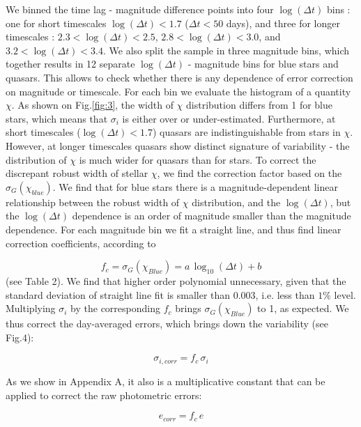 \documentclass[fleqn,usenatbib]{mnras}  %
\begin{document}
We binned the time lag - magnitude difference points into four $\log (\Delta t ) $ bins : one for short timescales  $\log (\Delta t ) < 1.7$ ($\Delta t < 50$ days), and three for longer timescales : $2.3<\log{(\Delta t)}<2.5$, $2.8<\log{(\Delta t)}<3.0$, and $3.2<\log{(\Delta t)}<3.4$.  We also split the sample in three magnitude bins, which together results in 12 separate $\log(\Delta t)$ - magnitude bins for blue stars and quasars. This allows to check whether there is any dependence of error correction on magnitude or timescale.  For each bin we evaluate the histogram of a quantity $\chi$. As shown on Fig.\ref{fig:3}, the width of $\chi$ distribution differs from 1 for blue stars, which means that $\sigma_{i}$ is either over or under-estimated. Furthermore, at short timescales ($\log{(\Delta t)} < 1.7$) quasars are indistinguishable from stars in $\chi$. However, at longer timescales quasars show distinct signature of variability - the distribution of $\chi$ is much wider for quasars than for stars. To correct the discrepant robust width of stellar $\chi$, we find the correction factor based on the $\sigma_{G}(\chi_{blue})$.  We find that for blue stars there is a magnitude-dependent  linear relationship between the robust width of $\chi$ distribution, and the $\log{(\Delta t)}$, but the $\log{(\Delta t)}$ dependence is an order of magnitude smaller than the magnitude dependence.  For each magnitude bin we fit a straight line, and thus find linear correction coefficients, according to 

\begin{equation}
\label{eq:fc}
f_{c} = \sigma_{G}(\chi_{Blue}) = a  \, \log_{10}(\Delta t) + b
\end{equation}
(see Table 2). We find that higher order polynomial unnecessary, given that the standard deviation of straight line fit is smaller than  0.003, i.e. less than $1\%$ level. 
Multiplying  $\sigma_{i}$ by the corresponding $f_{c}$ brings  $\sigma_{G}(\chi_{Blue})$ to 1, as expected. We thus correct the day-averaged errors, which brings down the variability (see Fig.4):

\begin{equation}
\sigma_{i,corr}  = f_{c} \, \sigma_{i}  
\end{equation} 

As we show in Appendix A, it also is a multiplicative constant that can be applied to correct the raw photometric errors: 

\begin{equation}
e_{corr} = f_{c} \, e
\end{equation}
\end{document}
